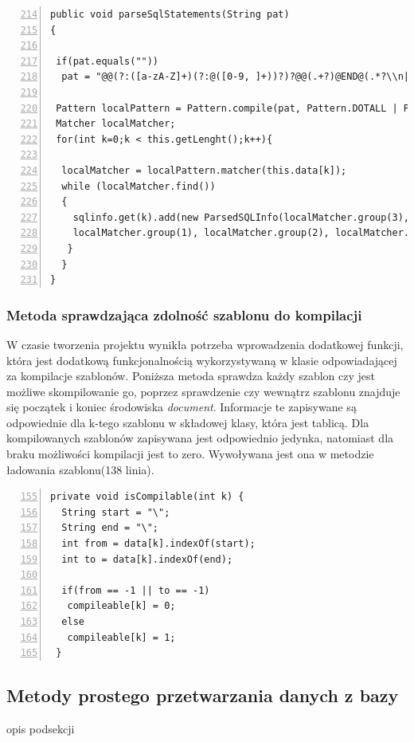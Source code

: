  \begin{lstlisting}[numbers=left,firstnumber=214]
public void parseSqlStatements(String pat)
{

 if(pat.equals(""))
  pat = "@@(?:([a-zA-Z]+)(?:@([0-9, ]+))?)?@@(.+?)@END@(.*?\\n|.*)";
    
 Pattern localPattern = Pattern.compile(pat, Pattern.DOTALL | Pattern.MULTILINE);
 Matcher localMatcher;
 for(int k=0;k < this.getLenght();k++){

  localMatcher = localPattern.matcher(this.data[k]);
  while (localMatcher.find())
  {
    sqlinfo.get(k).add(new ParsedSQLInfo(localMatcher.group(3),
    localMatcher.group(1), localMatcher.group(2), localMatcher.end()));
   }
  }
}
  \end{lstlisting}
   
\subsubsection*{Metoda sprawdzająca zdolność szablonu do kompilacji}

W czasie tworzenia projektu wynikła potrzeba wprowadzenia dodatkowej funkcji, która jest dodatkową funkcjonalnością wykorzystywaną w klasie odpowiadającej za kompilacje szablonów. Poniższa metoda sprawdza każdy szablon czy jest możliwe skompilowanie go, poprzez sprawdzenie czy wewnątrz szablonu znajduje się początek i koniec środowiska \emph{document}. Informacje te zapisywane są odpowiednie dla k-tego szablonu w składowej klasy, która jest tablicą. Dla kompilowanych szablonów zapisywana jest odpowiednio jedynka, natomiast dla braku możliwości kompilacji jest to zero. Wywoływana jest ona w metodzie ładowania szablonu(138 linia).

 \begin{lstlisting}[numbers=left,firstnumber=155]
 private void isCompilable(int k) {
  String start = "\";
  String end = "\";
  int from = data[k].indexOf(start);
  int to = data[k].indexOf(end);
        
  if(from == -1 || to == -1)
   compileable[k] = 0;
  else
   compileable[k] = 1;
 }
  \end{lstlisting}
  
\subsection{Metody prostego przetwarzania danych z bazy}

opis podsekcji

